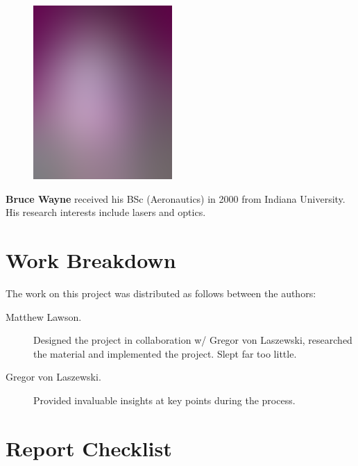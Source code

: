 \documentclass[9pt,twocolumn,twoside]{styles/osajnl}
\begin{document}
\begin{minipage}[t][3.2cm][t]{1.0\columnwidth} %
  \begin{figure}
    \includegraphics[width=0.25\columnwidth]{images/alice_smith.eps}
  \end{figure}
  \noindent
  {\bfseries Bruce Wayne} received his BSc (Aeronautics) in 2000 from
  Indiana University. His research interests include lasers and optics.
\end{minipage}
\endgroup

\newpage

\appendix

\section{Work Breakdown}

The work on this project was distributed as follows between the
authors:

\begin{description}

\item[Matthew Lawson.] Designed the project in collaboration w/ Gregor von Laszewski, researched the material and implemented the project.  Slept far too little.

\item[Gregor von Laszewski.] Provided invaluable insights at key points during the process.

\end{description}

\section{Report Checklist}
\end{document}
